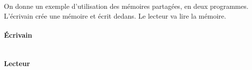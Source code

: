 \documentclass{exam}
\begin{document}
\begin{questions}
\begin{solution}
  On donne un exemple d'utilisation des mémoires partagées, en deux programmes.
  L'écrivain crée une mémoire et écrit dedans. Le lecteur va lire la mémoire.
  \paragraph{Écrivain}
  \inputminted{C}{corrected/shmem_writer.c}
  \paragraph{Lecteur}
  \inputminted{C}{corrected/shmem_reader.c}
\end{solution}

\end{questions}
\end{document}
